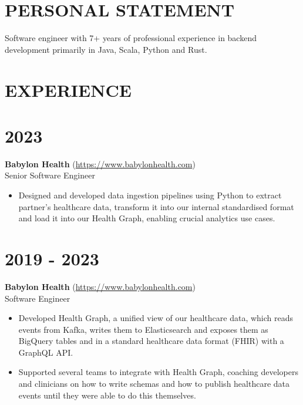 \documentclass[margin]{res}
\begin{document}
\begin{resume}

\section{PERSONAL STATEMENT}

Software engineer with 7+ years of professional experience in backend development primarily in Java, Scala, Python and Rust.

\section{EXPERIENCE}

\normalsize{\section{2023}}
{\bf Babylon Health} (\href{https://www.babylonhealth.com/}{https://www.babylonhealth.com}) \\
Senior Software Engineer

\begin{itemize}

\item
Designed and developed data ingestion pipelines using Python to extract partner's healthcare data, transform it into our internal standardised format and load it into our Health Graph, enabling crucial analytics use cases.

\end{itemize}

\normalsize{\section{2019 - 2023}}
{\bf Babylon Health} (\href{https://www.babylonhealth.com/}{https://www.babylonhealth.com}) \\
Software Engineer
\begin{itemize}

\item
Developed Health Graph, a unified view of our healthcare data, which reads events from Kafka, writes them to Elasticsearch and exposes them as BigQuery tables and in a standard healthcare data format (FHIR) with a GraphQL API.

\item
Supported several teams to integrate with Health Graph, coaching developers and clinicians on how to write schemas and how to publish healthcare data events until they were able to do this themselves.


\end{itemize}
\end{resume}
\end{document}
